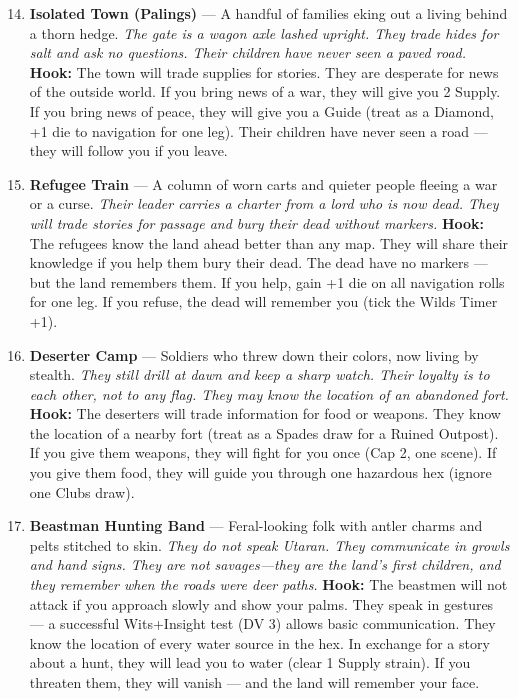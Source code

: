 \begin{enumerate}
\setcounter{enumi}{13}
\item \textbf{Isolated Town (Palings)} --- A handful of families eking out a living behind a thorn hedge.
  \hfill \textit{The gate is a wagon axle lashed upright. They trade hides for salt and ask no questions. Their children have never seen a paved road.}
  \textbf{Hook:} The town will trade supplies for stories. They are desperate for news of the outside world. If you bring news of a war, they will give you 2 Supply. If you bring news of peace, they will give you a Guide (treat as a Diamond, +1 die to navigation for one leg). Their children have never seen a road --- they will follow you if you leave.
  
\item \textbf{Refugee Train} --- A column of worn carts and quieter people fleeing a war or a curse.
  \hfill \textit{Their leader carries a charter from a lord who is now dead. They will trade stories for passage and bury their dead without markers.}
  \textbf{Hook:} The refugees know the land ahead better than any map. They will share their knowledge if you help them bury their dead. The dead have no markers --- but the land remembers them. If you help, gain +1 die on all navigation rolls for one leg. If you refuse, the dead will remember you (tick the Wilds Timer +1).
  
\item \textbf{Deserter Camp} --- Soldiers who threw down their colors, now living by stealth.
  \hfill \textit{They still drill at dawn and keep a sharp watch. Their loyalty is to each other, not to any flag. They may know the location of an abandoned fort.}
  \textbf{Hook:} The deserters will trade information for food or weapons. They know the location of a nearby fort (treat as a Spades draw for a Ruined Outpost). If you give them weapons, they will fight for you once (Cap 2, one scene). If you give them food, they will guide you through one hazardous hex (ignore one Clubs draw).
  
\item \textbf{Beastman Hunting Band} --- Feral-looking folk with antler charms and pelts stitched to skin.
  \hfill \textit{They do not speak Utaran. They communicate in growls and hand signs. They are not savages---they are the land's first children, and they remember when the roads were deer paths.}
  \textbf{Hook:} The beastmen will not attack if you approach slowly and show your palms. They speak in gestures --- a successful Wits+Insight test (DV 3) allows basic communication. They know the location of every water source in the hex. In exchange for a story about a hunt, they will lead you to water (clear 1 Supply strain). If you threaten them, they will vanish --- and the land will remember your face.
  

\end{enumerate}
